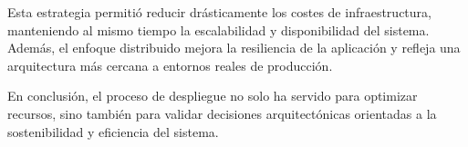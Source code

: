 Esta estrategia permitió reducir drásticamente los costes de infraestructura, manteniendo al mismo tiempo la escalabilidad y disponibilidad del sistema. Además, el enfoque distribuido mejora la resiliencia de la aplicación y refleja una arquitectura más cercana a entornos reales de producción.

En conclusión, el proceso de despliegue no solo ha servido para optimizar recursos, sino también para validar decisiones arquitectónicas orientadas a la sostenibilidad y eficiencia del sistema.